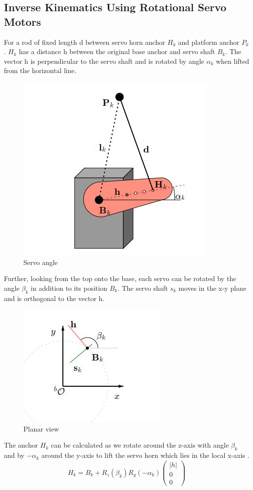 \subsection{Inverse Kinematics Using Rotational Servo Motors}
For a rod of fixed length d between servo horn anchor $H_{k}$ and platform anchor $P_{k}$.  $H_{k}$ has a distance h between the original base anchor and servo shaft $B_{k}$. The vector h is perpendicular to the servo shaft and is rotated by angle $\alpha_{k}$ when lifted from the horizontal line.
\begin{center}
	\begin{figure}[!h]
	\centering
	\includegraphics[width=0.4\linewidth]{Figures/servo}
	\caption[Servo angle]{Servo angle \cite{Eisele_2019}}
	\end{figure}
\end{center}
Further, looking from the top onto the base, each servo can be rotated by the angle $\beta_{k}$ in addition to its position $B_{k}$. The servo shaft $s_{k}$ moves in the x-y plane and is orthogonal to the vector h.
\begin{center}
	\begin{figure}[!h]
	\centering
	\includegraphics[width=0.4\linewidth]{Figures/servo1}
	\caption[Planar view]{Planar view \cite{Eisele_2019}}
	\end{figure}
\end{center}
The anchor $H_{k}$ can be calculated as we rotate around the z-axis with angle $\beta_{k}$ and  by $-\alpha_{k}$ around the y-axis to lift the servo horn which lies in the local x-axis \cite{Eisele_2019}.
\begin{equation}
H_{k} = B_{k} + R_{z}(\beta_{k}) R_{y}(-\alpha_{k})\begin{pmatrix}
|h|\\ 0 \\ 0
\end{pmatrix}
\label{eq:myeqn2}
\end{equation}
